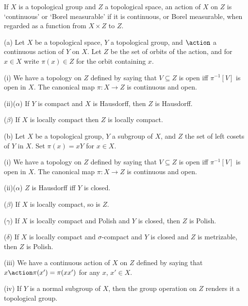 
 If $X$ is a topological group and $Z$ a
topological space, an action of $X$ on $Z$ is `continuous' or `Borel
measurable' if it is continuous, or Borel measurable, when regarded as a
function from $X\times Z$ to $Z$.


 (a)
Let $X$ be a topological space, $Y$ a topological group, and
$\action$ a continuous action of $Y$ on $X$.   Let $Z$ be the set of
orbits of the action, and for $x\in X$ write $\pi(x)\in Z$ for the orbit
containing $x$.

\quad(i)
We have a topology on $Z$ defined by saying that $V\subseteq Z$ is
open iff $\pi^{-1}[V]$ is open in $X$.   The canonical map $\pi:X\to Z$
is continuous and open.

\quad(ii)($\alpha$) If $Y$ is compact and $X$ is Hausdorff, then
$Z$ is Hausdorff.

\qquad($\beta$) If $X$ is locally compact then $Z$ is locally compact.

(b) Let $X$ be a topological
group, $Y$ a
subgroup of $X$, and $Z$ the set of left cosets of $Y$ in $X$.
Set $\pi(x)=xY$ for $x\in X$.

\quad (i) We have a topology on $Z$ defined by saying that $V\subseteq Z$
is open iff $\pi^{-1}[V]$ is open in $X$.
The canonical map $\pi:X\to Z$ is continuous and open.

\quad(ii)($\alpha$) $Z$ is Hausdorff iff $Y$ is closed.

\qquad($\beta$) If $X$ is locally compact, so is $Z$.

\qquad($\gamma$)
If $X$ is locally compact and Polish and $Y$ is closed, then
$Z$ is Polish.

\qquad($\delta$)
If $X$ is locally compact and $\sigma$-compact and $Y$ is closed
and $Z$ is metrizable, then $Z$ is Polish.

\quad(iii) We have a continuous action of $X$ on $Z$ defined by saying that
$x\action\pi(x')=\pi(xx')$ for any $x$, $x'\in X$.

\quad(iv) If $Y$ is a normal subgroup of $X$, then the group operation on
$Z$ renders it a topological group.

